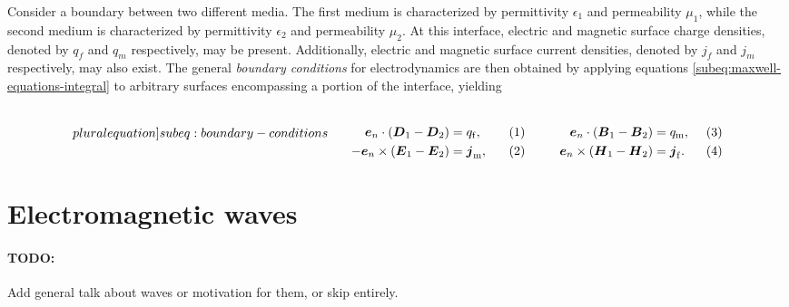 \documentclass[11pt,a4paper,twoside,openany]{report}
\begin{document}
Consider a boundary between two different media. The first medium is characterized by permittivity $\epsilon_1$ and permeability $\mu_1$, while the second medium is characterized by permittivity $\epsilon_2$ and permeability $\mu_2$. At this interface, electric and magnetic surface charge densities, denoted by $q_f$ and $q_m$ respectively, may be present. Additionally, electric and magnetic surface current densities, denoted by $j_f$ and $j_m$ respectively, may also exist. The general \emph{boundary conditions} for electrodynamics are then obtained by applying equations \cref{subeq:maxwell-equations-integral} to arbitrary surfaces encompassing a portion of the interface, yielding

\begin{subequations}
    \label[pluralequation]{subeq:boundary-conditions}
    \noindent\centering
    \begin{minipage}{0.45\textwidth}
        \begin{align}
            \label{eq:boundary-conditions-d-normal}
            \vec e_n \cdot (\vec D_1 - \vec D_2) &= q_{\mathrm f},
        \\
            \label{eq:boundary-conditions-e-tangential}
            -\vec e_n \times (\vec E_1 - \vec E_2) &= \vec j_{\mathrm m},
        \end{align}
    \end{minipage}
    \hfill
    \begin{minipage}{0.45\textwidth}
        \begin{align}
            \label{eq:boundary-conditions-b-normal}
            \vec e_n \cdot (\vec B_1 - \vec B_2) &= q_{\mathrm m},
        \\
            \label{eq:boundary-conditions-H-tangential}
            \vec e_n \times (\vec H_1 - \vec H_2) &= \vec j_{\mathrm f}.
        \end{align}
    \end{minipage}
    \bigskip
\end{subequations}

\section{Electromagnetic waves}
\label{sec:electromagnetic-waves}
\paragraph{TODO:} Add general talk about waves or motivation for them, or skip entirely.
\end{document}
